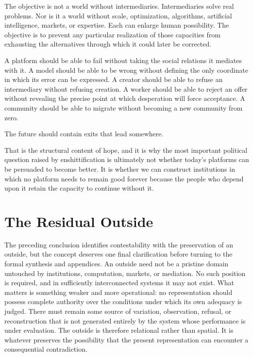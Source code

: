 \documentclass[11pt]{article}
\begin{document}
The objective is not a world without intermediaries. Intermediaries solve real problems. Nor is it a world without scale, optimization, algorithms, artificial intelligence, markets, or expertise. Each can enlarge human possibility. The objective is to prevent any particular realization of those capacities from exhausting the alternatives through which it could later be corrected.

A platform should be able to fail without taking the social relations it mediates with it. A model should be able to be wrong without defining the only coordinate in which its error can be expressed. A creator should be able to refuse an intermediary without refusing creation. A worker should be able to reject an offer without revealing the precise point at which desperation will force acceptance. A community should be able to migrate without becoming a new community from zero.

The future should contain exits that lead somewhere.

That is the structural content of hope, and it is why the most important political question raised by enshittification is ultimately not whether today's platforms can be persuaded to become better. It is whether we can construct institutions in which no platform needs to remain good forever because the people who depend upon it retain the capacity to continue without it.

\section{The Residual Outside}

The preceding conclusion identifies contestability with the preservation of an outside, but the concept deserves one final clarification before turning to the formal synthesis and appendices. An outside need not be a pristine domain untouched by institutions, computation, markets, or mediation. No such position is required, and in sufficiently interconnected systems it may not exist. What matters is something weaker and more operational: no representation should possess complete authority over the conditions under which its own adequacy is judged. There must remain some source of variation, observation, refusal, or reconstruction that is not generated entirely by the system whose performance is under evaluation. The outside is therefore relational rather than spatial. It is whatever preserves the possibility that the present representation can encounter a consequential contradiction.
\end{document}
